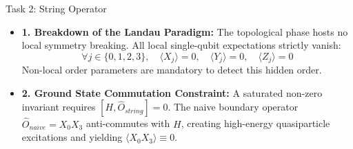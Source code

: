 \documentclass[aspectratio=169, 12pt]{beamer}
\begin{document}
\begin{frame}{Task 2: String Operator}
    \centering
    \vspace{0.15cm}
    \begin{itemize}
        \item \textbf{1. Breakdown of the Landau Paradigm:} The topological phase hosts no local symmetry breaking. All local single-qubit expectations strictly vanish:
        $$\forall j \in \{0,1,2,3\}, \quad \langle X_j \rangle = 0, \quad \langle Y_j \rangle = 0, \quad \langle Z_j \rangle = 0$$
        Non-local order parameters are mandatory to detect this hidden order.
        \item \textbf{2. Ground State Commutation Constraint:} A saturated non-zero invariant requires $[H, \hat{O}_{string}] = 0$. The naive boundary operator $\hat{O}_{naive} = X_0 X_3$ anti-commutes with $H$, creating high-energy quasiparticle excitations and yielding $\langle X_0 X_3 \rangle \equiv 0$.
    \end{itemize}
\end{frame}
\end{document}
